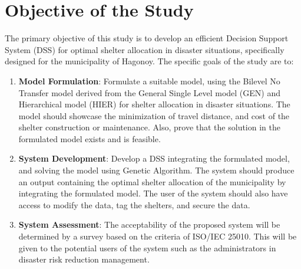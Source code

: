 \section{Objective of the Study}

The primary objective of this study is to develop an efficient Decision Support System (DSS) for optimal shelter allocation in disaster situations, specifically designed for the municipality of Hagonoy. The specific goals of the study are to:

\begin{enumerate}
	\item \textbf{Model Formulation}: Formulate a suitable model, using the Bilevel No Transfer model derived from the General Single Level model (GEN) and Hierarchical model (HIER) for shelter allocation in disaster situations. The model should showcase the minimization of travel distance, and cost of the shelter construction or maintenance. Also, prove that the solution in the formulated model exists and is feasible.
	
	\item \textbf{System Development}: Develop a DSS integrating the formulated model, and solving the model using Genetic Algorithm. The system should produce an output containing the optimal shelter allocation of the municipality by integrating the formulated model. The user of the system should also have access to modify the data, tag the shelters, and secure the data.
	
	\item \textbf{System Assessment}: The acceptability of the proposed system will be determined by a survey based on the criteria of ISO/IEC 25010. This will be given to the potential users of the system such as the administrators in disaster risk reduction management.
	
	
\end{enumerate}